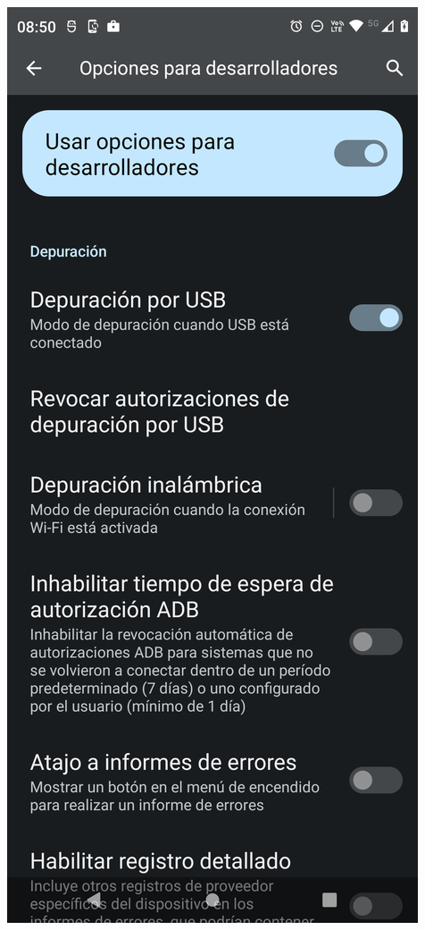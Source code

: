 \begin{frame}
\begin{columns}
\begin{center}
\end{center}
\begin{center}
\includegraphics[width=0.95\linewidth]{01_Configurar/ModoDesarrollador8.png}    
\end{center}
\end{columns}
\end{frame}

